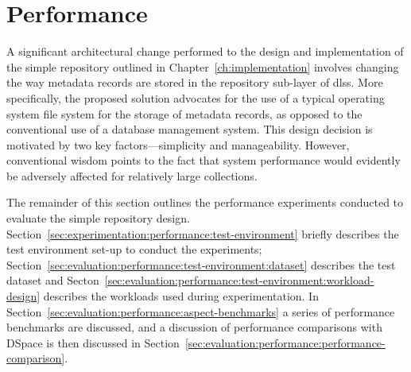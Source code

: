 \section[Performance]{Performance} \label{sec:evaluation:performance}


%




A significant architectural change performed to the design and implementation of the simple repository outlined in Chapter~\ref{ch:implementation} involves changing the way metadata records are stored in the repository sub-layer of \glspl{dls}. More specifically, the proposed solution advocates for the use of a typical operating system file system for the storage of metadata records, as opposed to the conventional use of a database management system. This design decision is motivated by two key factors---simplicity and manageability. However, conventional wisdom \citep{Nicola2003,Sears2007} points to the fact that system performance would evidently be adversely affected for relatively large collections.

The remainder of this section outlines the performance experiments conducted to evaluate the simple repository design. Section~\ref{sec:experimentation:performance:test-environment} briefly describes the test environment set-up to conduct the experiments; Section~\ref{sec:evaluation:performance:test-environment:dataset} describes the test dataset and Secton~\ref{sec:evaluation:performance:test-environment:workload-design} describes the workloads used during experimentation. In Section~\ref{sec:evaluation:performance:aspect-benchmarks} a series of performance benchmarks are discussed, and a discussion of performance comparisons with DSpace is then discussed in Section~\ref{sec:evaluation:performance:performance-comparison}.

